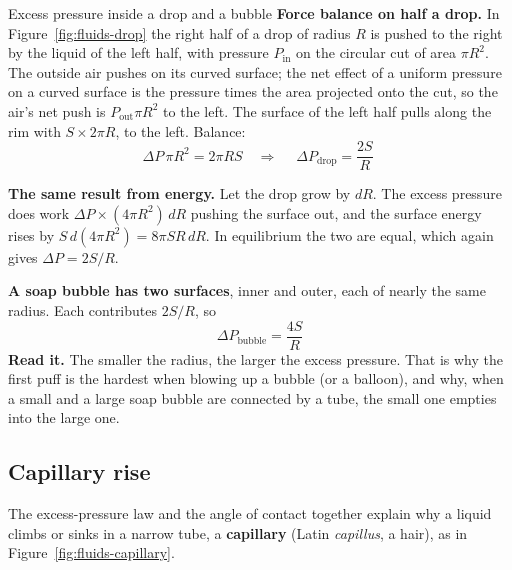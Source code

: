 \begin{derivbox}{Excess pressure inside a drop and a bubble}
 \textbf{Force balance on half a drop.} In Figure~\ref{fig:fluids-drop} the right half of a drop of
radius $R$ is pushed to the right by the liquid of the left half, with pressure $P_{\text{in}}$ on the
circular cut of area $\pi R^2$. The outside air pushes on its curved surface; the net effect of a uniform
pressure on a curved surface is the pressure times the area projected onto the cut, so the air's net push
is $P_{\text{out}}\pi R^2$ to the left. The surface of the left half pulls along the rim with
$S\times2\pi R$, to the left. Balance:
\[
\Delta P\,\pi R^2=2\pi RS\quad\Longrightarrow\quad\boxed{\;\Delta P_{\text{drop}}=\frac{2S}{R}\;}
\]

 \textbf{The same result from energy.} Let the drop grow by $dR$. The excess pressure does work
$\Delta P\times(4\pi R^2)\,dR$ pushing the surface out, and the surface energy rises by
$S\,d(4\pi R^2)=8\pi SR\,dR$. In equilibrium the two are equal, which again gives $\Delta P=2S/R$.

 \textbf{A soap bubble has two surfaces}, inner and outer, each of nearly the same radius. Each
contributes $2S/R$, so
\[
\boxed{\;\Delta P_{\text{bubble}}=\frac{4S}{R}\;}
\]
 \textbf{Read it.} The smaller the radius, the larger the excess pressure. That is why the first
puff is the hardest when blowing up a bubble (or a balloon), and why, when a small and a large soap bubble
are connected by a tube, the small one empties into the large one.
\end{derivbox}

\subsection{Capillary rise}

The excess-pressure law and the angle of contact together explain why a liquid climbs or sinks in a narrow
tube, a \textbf{capillary} (Latin \emph{capillus}, a hair), as in Figure~\ref{fig:fluids-capillary}.

\begin{figure}[htbp]
\centering
{}
\end{figure}

